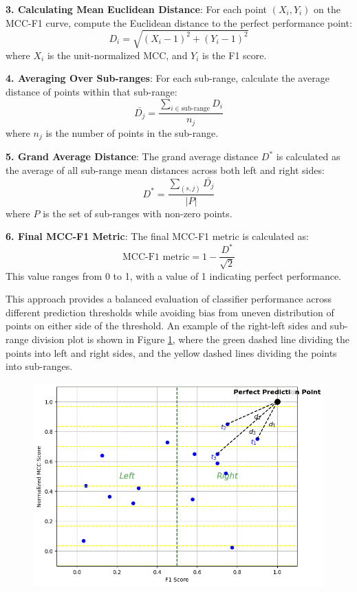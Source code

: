 \documentclass[12pt, oneside]{amsart}
\theoremstyle{definition}
\theoremstyle{remark}
\numberwithin{equation}{section}
\begin{document}
\textbf{3. Calculating Mean Euclidean Distance}:
   For each point \((X_i, Y_i)\) on the MCC-F1 curve, compute the Euclidean distance to the perfect performance point:
   \[
   D_i = \sqrt{(X_i - 1)^2 + (Y_i - 1)^2}
   \]
   where \( X_i \) is the unit-normalized MCC, and \( Y_i \) is the F1 score.

\textbf{4. Averaging Over Sub-ranges}:
   For each sub-range, calculate the average distance of points within that sub-range:
   \[
   \bar{D_j} = \frac{\sum_{i \in \text{sub-range}} D_i}{n_j}
   \]
   where \( n_j \) is the number of points in the sub-range.

\textbf{5. Grand Average Distance}:
   The grand average distance \( D^* \) is calculated as the average of all sub-range mean distances across both left and right sides:
   \[
   D^* = \frac{\sum_{(s, j)} \bar{D_j}}{|P|}
   \]
   where \( P \) is the set of sub-ranges with non-zero points.

\textbf{6. Final MCC-F1 Metric}:
   The final MCC-F1 metric is calculated as:
   \[
   \text{MCC-F1 metric} = 1 - \frac{D^*}{\sqrt{2}}
   \]
   This value ranges from 0 to 1, with a value of 1 indicating perfect performance.

This approach provides a balanced evaluation of classifier performance across different prediction thresholds while avoiding bias from uneven distribution of points on either side of the threshold. An example of the right-left sides and sub-range division plot is shown in Figure \ref{figure2}, where the green dashed line dividing the points into left and right sides, and the yellow dashed lines dividing the points into sub-ranges. 
\begin{figure}[hbt!]
    \caption{}
    \centering
    \includegraphics[scale=0.3]{Report/Figure/figure2.jpg}
    \label{figure2}
\end{figure}
\FloatBarrier
\end{document}
